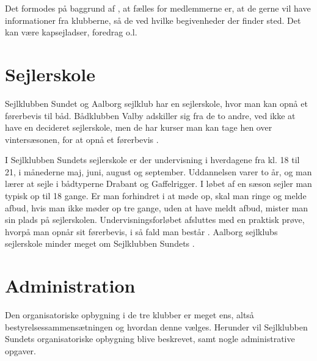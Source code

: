 Det formodes på baggrund af , at fælles for medlemmerne er, at de gerne vil have informationer fra klubberne, så de ved hvilke begivenheder der finder sted. 
Det kan være kapsejladser, foredrag o.l.


\section{Sejlerskole}\label{sec:sejlerskole}

Sejlklubben Sundet og Aalborg sejlklub har en sejlerskole, hvor man kan opnå et førerbevis til båd. 
Bådklubben Valby adskiller sig fra de to andre, ved ikke at have en decideret sejlerskole, men de har kurser man kan tage hen over vintersæsonen, for at opnå et førerbevis \citep{baedklubben_valby_duelighedsbevis}.

I Sejlklubben Sundets sejlerskole er der undervisning i hverdagene fra kl. 18 til 21, i månederne
maj, juni, august og september. 
Uddannelsen varer to år, og man lærer at sejle i bådtyperne Drabant og Gaffelrigger. 
I løbet af en sæson sejler man typisk op til 18 gange. 
Er man forhindret i at møde op, skal man ringe og melde afbud, hvis man ikke møder op tre gange, uden at have meldt afbud, mister man sin plads på sejlerskolen.
Undervisningsforløbet afsluttes med en praktisk prøve, hvorpå man opnår sit førerbevis, i så
fald man består \citep{Sundet}. 
Aalborg sejlklubs sejlerskole minder meget om Sejlklubben Sundets \citep{aalborg_sejlklub_sejlerskole}.


\section{Administration}\label{sec:organisatoriske-opbygning}

Den organisatoriske opbygning i de tre klubber er meget ens, altså bestyrelsessammensætningen og hvordan denne
vælges. Herunder vil Sejlklubben Sundets organisatoriske opbygning blive beskrevet, samt nogle administrative
opgaver.





